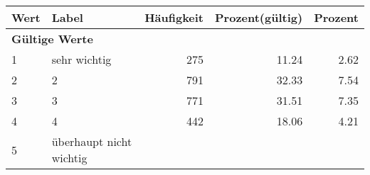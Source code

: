     \begin{longtable}{lXrrr}
     \toprule
     \textbf{Wert} & \textbf{Label} & \textbf{Häufigkeit} & \textbf{Prozent(gültig)} & \textbf{Prozent} \\
     \endhead
     \midrule
     \multicolumn{5}{l}{\textbf{Gültige Werte}}\\

     1 &
     \multicolumn{1}{X}{ sehr wichtig   } &


       \num{275} &
       \num[round-mode=places,round-precision=2]{11.24} &
         \num[round-mode=places,round-precision=2]{2.62} \\

     2 &
     \multicolumn{1}{X}{ 2   } &


       \num{791} &
       \num[round-mode=places,round-precision=2]{32.33} &
         \num[round-mode=places,round-precision=2]{7.54} \\

     3 &
     \multicolumn{1}{X}{ 3   } &


       \num{771} &
       \num[round-mode=places,round-precision=2]{31.51} &
         \num[round-mode=places,round-precision=2]{7.35} \\

     4 &
     \multicolumn{1}{X}{ 4   } &


       \num{442} &
       \num[round-mode=places,round-precision=2]{18.06} &
         \num[round-mode=places,round-precision=2]{4.21} \\

     5 &
     \multicolumn{1}{X}{ überhaupt nicht wichtig   } &



\end{longtable}
